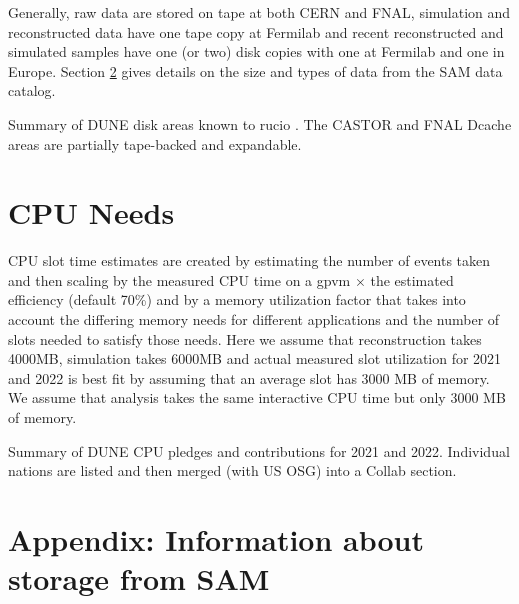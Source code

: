 \documentclass[12pt]{article}
\begin{document}
Generally, raw data are stored on tape at both CERN and FNAL, simulation and reconstructed data  have one tape copy at Fermilab and recent reconstructed and simulated samples have one (or two) disk copies with one at Fermilab and one in Europe.  Section \ref{storage} gives details on the size and types of data from the SAM data catalog.



\begin{table}[ht]
\centering{}
 \label{tab:RSEUsage}
\caption{Summary  of DUNE disk areas known to rucio \cite{scotgrid}.  The CASTOR and FNAL Dcache areas are partially tape-backed and expandable. }
\end{table}




\section{CPU Needs}

CPU  slot time estimates are created by estimating the number of events taken and then scaling by the measured CPU time on a gpvm $\times$ the estimated efficiency (default 70\%) and by a memory utilization factor that takes into account the differing memory needs for different applications and the number of slots needed to satisfy those needs.  Here we assume that reconstruction takes 4000MB, simulation takes 6000MB and actual measured  slot utilization for 2021 and 2022 is best fit by assuming that an average slot has 3000 MB of memory.    We assume that analysis takes the same interactive CPU time but only 3000 MB of memory.  

\begin{table}[ht]
\centering{}
 \label{tab:CPUUsage}
\caption{Summary  of DUNE CPU pledges and contributions for 2021 and 2022.  Individual nations are listed and then merged (with US OSG) into a Collab section.  }
\end{table}




\clearpage
\section{Appendix: Information about storage from SAM}\label{storage}
\end{document}
